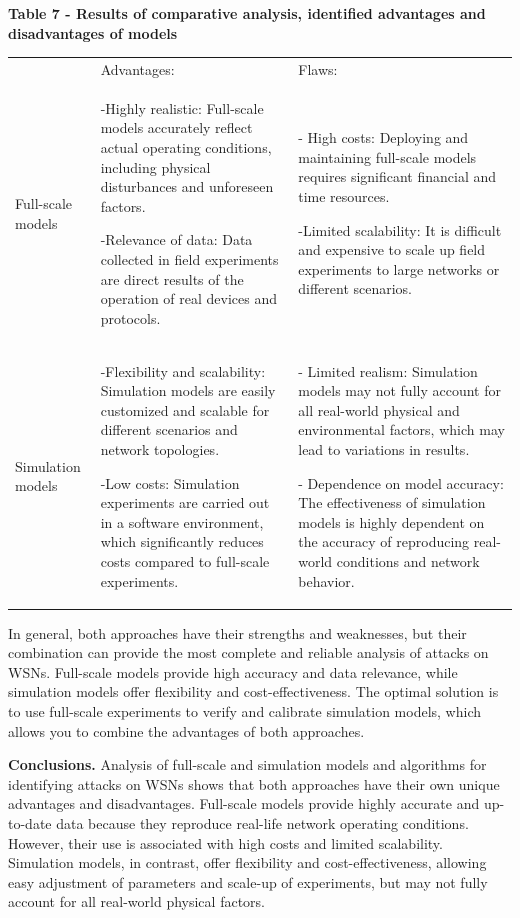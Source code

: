 {\bfseries Table 7 - Results of comparative analysis, identified advantages
and disadvantages of models}

\begin{longtable}[]{@{}
  >{\raggedright\arraybackslash}p{}
  >{\raggedright\arraybackslash}p{}
  >{\raggedright\arraybackslash}p{}@{}}
\toprule\noalign{}
\endhead
\bottomrule\noalign{}
\endlastfoot
& Advantages: & Flaws: \\
Full-scale models & -Highly realistic: Full-scale models accurately
reflect actual operating conditions, including physical disturbances and
unforeseen factors.

-Relevance of data: Data collected in field experiments are direct
results of the operation of real devices and protocols. & - High costs:
Deploying and maintaining full-scale models requires significant
financial and time resources.

-Limited scalability: It is difficult and expensive to scale up field
experiments to large networks or different scenarios. \\
Simulation models & -Flexibility and scalability: Simulation models are
easily customized and scalable for different scenarios and network
topologies.

-Low costs: Simulation experiments are carried out in a software
environment, which significantly reduces costs compared to full-scale
experiments. & - Limited realism: Simulation models may not fully
account for all real-world physical and environmental factors, which may
lead to variations in results.

- Dependence on model accuracy: The effectiveness of simulation models
is highly dependent on the accuracy of reproducing real-world conditions
and network behavior. \\
\end{longtable}

In general, both approaches have their strengths and weaknesses, but
their combination can provide the most complete and reliable analysis of
attacks on WSNs. Full-scale models provide high accuracy and data
relevance, while simulation models offer flexibility and
cost-effectiveness. The optimal solution is to use full-scale
experiments to verify and calibrate simulation models, which allows you
to combine the advantages of both approaches.

{\bfseries Conclusions.} Analysis of full-scale and simulation models and
algorithms for identifying attacks on WSNs shows that both approaches
have their own unique advantages and disadvantages. Full-scale models
provide highly accurate and up-to-date data because they reproduce
real-life network operating conditions. However, their use is associated
with high costs and limited scalability. Simulation models, in contrast,
offer flexibility and cost-effectiveness, allowing easy adjustment of
parameters and scale-up of experiments, but may not fully account for
all real-world physical factors.

